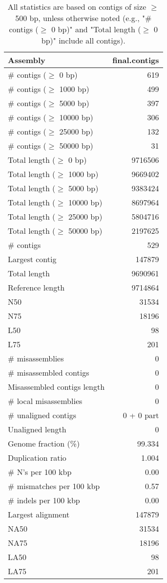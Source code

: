 \documentclass[12pt,a4paper]{article}
\begin{document}
\begin{table}[ht]
\begin{center}
\caption{All statistics are based on contigs of size $\geq$ 500 bp, unless otherwise noted (e.g., "\# contigs ($\geq$ 0 bp)" and "Total length ($\geq$ 0 bp)" include all contigs).}
\begin{tabular}{|l*{1}{|r}|}
\hline
Assembly & final.contigs \\ \hline
\# contigs ($\geq$ 0 bp) & 619 \\ \hline
\# contigs ($\geq$ 1000 bp) & 499 \\ \hline
\# contigs ($\geq$ 5000 bp) & 397 \\ \hline
\# contigs ($\geq$ 10000 bp) & 306 \\ \hline
\# contigs ($\geq$ 25000 bp) & 132 \\ \hline
\# contigs ($\geq$ 50000 bp) & 31 \\ \hline
Total length ($\geq$ 0 bp) & 9716506 \\ \hline
Total length ($\geq$ 1000 bp) & 9669402 \\ \hline
Total length ($\geq$ 5000 bp) & 9383424 \\ \hline
Total length ($\geq$ 10000 bp) & 8697964 \\ \hline
Total length ($\geq$ 25000 bp) & 5804716 \\ \hline
Total length ($\geq$ 50000 bp) & 2197625 \\ \hline
\# contigs & 529 \\ \hline
Largest contig & 147879 \\ \hline
Total length & 9690961 \\ \hline
Reference length & 9714864 \\ \hline
N50 & 31534 \\ \hline
N75 & 18196 \\ \hline
L50 & 98 \\ \hline
L75 & 201 \\ \hline
\# misassemblies & 0 \\ \hline
\# misassembled contigs & 0 \\ \hline
Misassembled contigs length & 0 \\ \hline
\# local misassemblies & 0 \\ \hline
\# unaligned contigs & 0 + 0 part \\ \hline
Unaligned length & 0 \\ \hline
Genome fraction (\%) & 99.334 \\ \hline
Duplication ratio & 1.004 \\ \hline
\# N's per 100 kbp & 0.00 \\ \hline
\# mismatches per 100 kbp & 0.57 \\ \hline
\# indels per 100 kbp & 0.00 \\ \hline
Largest alignment & 147879 \\ \hline
NA50 & 31534 \\ \hline
NA75 & 18196 \\ \hline
LA50 & 98 \\ \hline
LA75 & 201 \\ \hline
\end{tabular}
\end{center}
\end{table}
\end{document}
